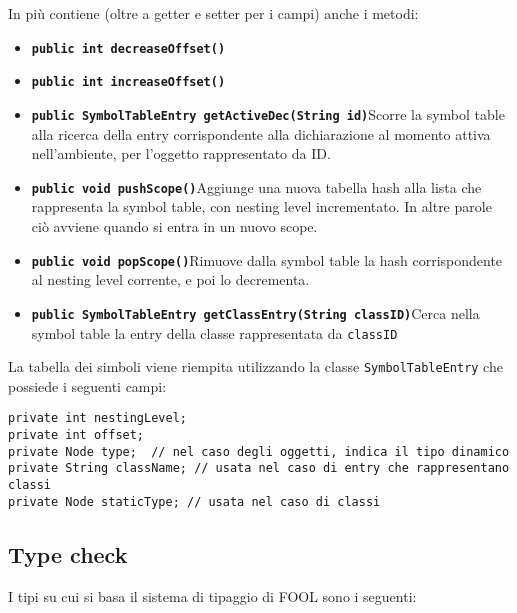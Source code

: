 \documentclass[a4paper]{article}   %
\begin{document}
In più contiene (oltre a getter e setter per i campi) anche i metodi:\\
\begin{itemize}
  \item \textbf{\lstinline|public int decreaseOffset()|}
  \item \textbf{\lstinline|public int increaseOffset()|}
  \item \textbf{\lstinline|public SymbolTableEntry getActiveDec(String id)|}\newline Scorre la symbol table
  alla ricerca della entry corrispondente alla dichiarazione al momento attiva nell'ambiente, per l'oggetto rappresentato da ID.
  \item \textbf{\lstinline|public void pushScope()|}\newline Aggiunge una nuova tabella hash alla lista che rappresenta la symbol table, con nesting level incrementato. In altre parole ciò avviene quando si entra in un nuovo scope.
  \item \textbf{\lstinline|public void popScope()|}\newline Rimuove dalla symbol table la hash corrispondente al nesting level corrente, e poi lo decrementa.
  \item \textbf{\lstinline|public SymbolTableEntry getClassEntry(String classID)|}\newline Cerca nella symbol table la entry della classe rappresentata da \lstinline|classID|

\end{itemize}

La tabella dei simboli viene riempita utilizzando la classe \lstinline|SymbolTableEntry| che possiede i seguenti campi:
\begin{lstlisting}[basicstyle=\footnotesize\ttfamily]
private int nestingLevel;
private int offset;
private Node type;  // nel caso degli oggetti, indica il tipo dinamico
private String className; // usata nel caso di entry che rappresentano classi
private Node staticType; // usata nel caso di classi
\end{lstlisting}

\subsection{Type check}
I tipi su cui si basa il sistema di tipaggio di FOOL sono i seguenti:
\end{document}
